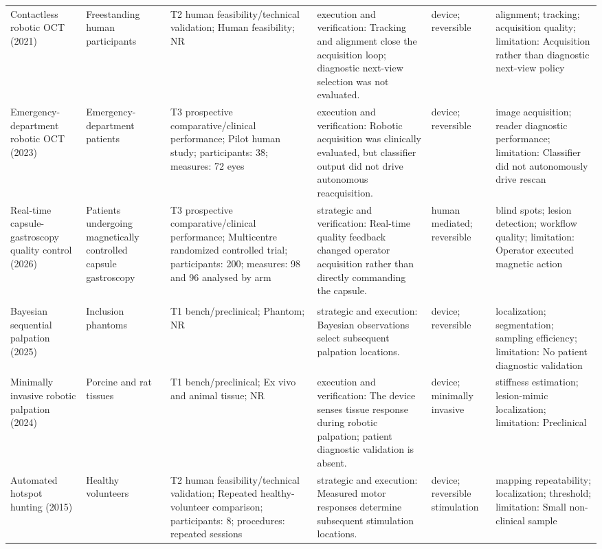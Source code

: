 \begin{longtable}{L{0.15\textwidth} L{0.13\textwidth} L{0.17\textwidth} L{0.17\textwidth} L{0.12\textwidth} L{0.14\textwidth}}
Contactless robotic OCT (2021) \cite{swanson2021roboticoct} & Freestanding human participants & T2 human feasibility/technical validation; Human feasibility; NR & execution and verification: Tracking and alignment close the acquisition loop; diagnostic next-view selection was not evaluated. & device; reversible & alignment; tracking; acquisition quality; limitation: Acquisition rather than diagnostic next-view policy \\
Emergency-department robotic OCT (2023) \cite{wang2023roboticocted} & Emergency-department patients & T3 prospective comparative/clinical performance; Pilot human study; participants: 38; measures: 72 eyes & execution and verification: Robotic acquisition was clinically evaluated, but classifier output did not drive autonomous reacquisition. & device; reversible & image acquisition; reader diagnostic performance; limitation: Classifier did not autonomously drive rescan \\
Real-time capsule-gastroscopy quality control (2026) \cite{qian2026capsuleqc} & Patients undergoing magnetically controlled capsule gastroscopy & T3 prospective comparative/clinical performance; Multicentre randomized controlled trial; participants: 200; measures: 98 and 96 analysed by arm & strategic and verification: Real-time quality feedback changed operator acquisition rather than directly commanding the capsule. & human mediated; reversible & blind spots; lesion detection; workflow quality; limitation: Operator executed magnetic action \\
\addlinespace[2pt]\\
Bayesian sequential palpation (2025) \cite{li2025sequentialpalpation} & Inclusion phantoms & T1 bench/preclinical; Phantom; NR & strategic and execution: Bayesian observations select subsequent palpation locations. & device; reversible & localization; segmentation; sampling efficiency; limitation: No patient diagnostic validation \\
Minimally invasive robotic palpation (2024) \cite{vardakastani2024palpation} & Porcine and rat tissues & T1 bench/preclinical; Ex vivo and animal tissue; NR & execution and verification: The device senses tissue response during robotic palpation; patient diagnostic validation is absent. & device; minimally invasive & stiffness estimation; lesion-mimic localization; limitation: Preclinical \\
Automated hotspot hunting (2015) \cite{harquel2017closedlooptms} & Healthy volunteers & T2 human feasibility/technical validation; Repeated healthy-volunteer comparison; participants: 8; procedures: repeated sessions & strategic and execution: Measured motor responses determine subsequent stimulation locations. & device; reversible stimulation & mapping repeatability; localization; threshold; limitation: Small non-clinical sample \\

\end{longtable}
